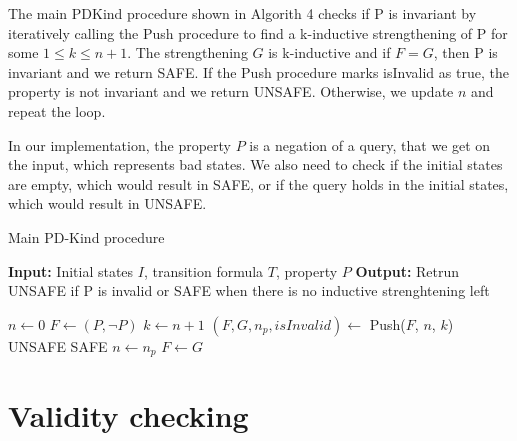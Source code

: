 \noindent The main PDKind procedure shown in Algorith 4 checks if P is invariant by iteratively calling the Push procedure to find a k-inductive strengthening of P for some $1 \leq k \leq n + 1$. The strengthening $G$ is k-inductive and if $F = G$, then P is invariant and we return SAFE. If the Push procedure marks isInvalid as true, the property is not invariant and we return UNSAFE. Otherwise, we update $n$ and repeat the loop.

In our implementation, the property $P$ is a negation of a query, that we get on the input, which represents bad states. We also need to check if the initial states are empty, which would result in SAFE, or if the query holds in the initial states, which would result in UNSAFE.

\begin{algorithm}
\caption{Main PD-Kind procedure}
\begin{algorithmic}[1]
\State \textbf{Input:} Initial states $I$, transition formula $T$, property $P$
\State \textbf{Output:} Retrun UNSAFE if P is invalid or SAFE when there is no inductive strenghtening left

\State $n \gets 0$
    \State $F \gets (P, \neg P)$
        \State $k \gets n + 1$
        \State $(F, G, n_p, isInvalid) \gets$ Push($F$, $n$, $k$)
        \State \Return UNSAFE
        \EndIf
        \State \Return SAFE
        \EndIf
        \State $n \gets n_p$
        \State $F \gets G$
    \EndWhile

\end{algorithmic}
\end{algorithm}
\newpage
\section{Validity checking}

